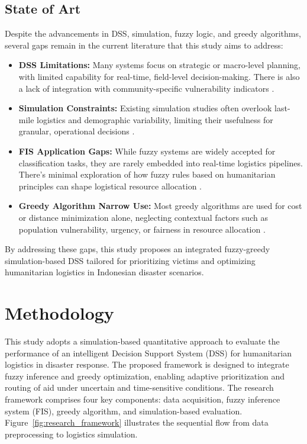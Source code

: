 \documentclass[conference,final,a4paper,twoside,10pt]{IEEEtran}
\begin{document}
\subsection{State of Art}
Despite the advancements in DSS, simulation, fuzzy logic, and greedy algorithms, several gaps remain in the current literature that this study aims to address:

\begin{itemize}
    \item \textbf{DSS Limitations:} Many systems focus on strategic or macro-level planning, with limited capability for real-time, field-level decision-making. There is also a lack of integration with community-specific vulnerability indicators \cite{steinhauser2025understanding}.
    \item \textbf{Simulation Constraints:} Existing simulation studies often overlook last-mile logistics and demographic variability, limiting their usefulness for granular, operational decisions \cite{ampaw2025developing}.
    \item \textbf{FIS Application Gaps:} While fuzzy systems are widely accepted for classification tasks, they are rarely embedded into real-time logistics pipelines. There's minimal exploration of how fuzzy rules based on humanitarian principles can shape logistical resource allocation \cite{anjomshoae2021integrated, improta2020fuzzy, jain2020membership, yoon2023novel}.
    \item \textbf{Greedy Algorithm Narrow Use:} Most greedy algorithms are used for cost or distance minimization alone, neglecting contextual factors such as population vulnerability, urgency, or fairness in resource allocation \cite{shirmarz2020adaptive, hamidouglu2023game}.
\end{itemize}

By addressing these gaps, this study proposes an integrated fuzzy-greedy simulation-based DSS tailored for prioritizing victims and optimizing humanitarian logistics in Indonesian disaster scenarios.


\section{Methodology} 

This study adopts a simulation-based quantitative approach to evaluate the performance of an intelligent Decision Support System (DSS) for humanitarian logistics in disaster response. The proposed framework is designed to integrate fuzzy inference and greedy optimization, enabling adaptive prioritization and routing of aid under uncertain and time-sensitive conditions.
The research framework comprises four key components: data acquisition, fuzzy inference system (FIS), greedy algorithm, and simulation-based evaluation. Figure~\ref{fig:research_framework} illustrates the sequential flow from data preprocessing to logistics simulation.
\end{document}
